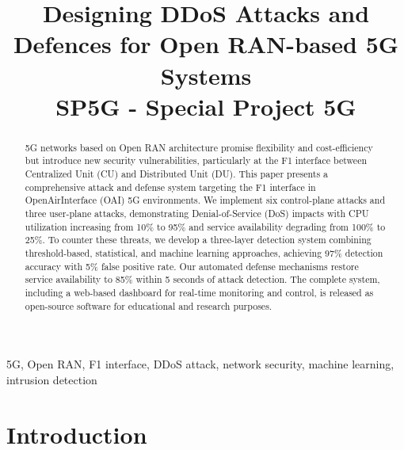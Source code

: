 \documentclass[conference]{IEEEtran}
\begin{document}
\title{Designing DDoS Attacks and Defences for Open RAN-based 5G Systems\\
{\footnotesize SP5G - Special Project 5G}}

\author{
\and
{}
}

\maketitle

\begin{abstract}
5G networks based on Open RAN architecture promise flexibility and cost-efficiency but introduce new security vulnerabilities, particularly at the F1 interface between Centralized Unit (CU) and Distributed Unit (DU). This paper presents a comprehensive attack and defense system targeting the F1 interface in OpenAirInterface (OAI) 5G environments. We implement six control-plane attacks and three user-plane attacks, demonstrating Denial-of-Service (DoS) impacts with CPU utilization increasing from 10\% to 95\% and service availability degrading from 100\% to 25\%. To counter these threats, we develop a three-layer detection system combining threshold-based, statistical, and machine learning approaches, achieving 97\% detection accuracy with 5\% false positive rate. Our automated defense mechanisms restore service availability to 85\% within 5 seconds of attack detection. The complete system, including a web-based dashboard for real-time monitoring and control, is released as open-source software for educational and research purposes.
\end{abstract}

\begin{IEEEkeywords}
5G, Open RAN, F1 interface, DDoS attack, network security, machine learning, intrusion detection
\end{IEEEkeywords}

\section{Introduction}
\end{document}
